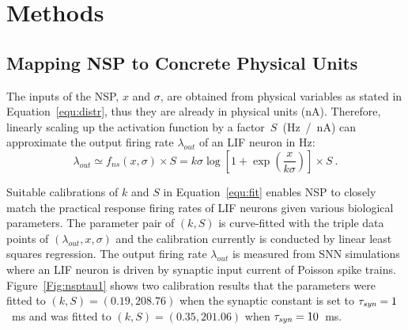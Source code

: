 \documentclass{article}
\begin{document}
	
	\section{Methods}	
	\label{sec:meth}
	
	\subsection{Mapping NSP to Concrete Physical Units}
	\label{sec:af_model}
	The inputs of the NSP, $x$ and $\sigma$, are obtained from physical variables as stated in Equation~\ref{equ:distr}, thus they are already in physical units (nA).
	Therefore, linearly scaling up the activation function by a factor~$S$~(Hz~/~nA) can approximate the output firing rate $\lambda_{out}$ of an LIF neuron in Hz:
	\begin{equation}
	\lambda_{out} \simeq f_{ns}(x, \sigma) \times S = k \sigma \log [1 + \exp(\frac{x}{k \sigma})] \times S~.
	\label{equ:fit}
	\end{equation}	
	
	
	Suitable calibrations of $k$ and $S$ in Equation~\ref{equ:fit} enables NSP to closely match the practical response firing rates of LIF neurons given various biological parameters.
	The parameter pair of $(k, S)$ is curve-fitted with the triple data points of $(\lambda_{out}, x, \sigma)$ and the calibration currently is conducted by linear least squares regression.
	The output firing rate $\lambda_{out}$ is measured from SNN simulations where an LIF neuron is driven by synaptic input current of Poisson spike trains.
	Figure~\ref{Fig:nsptau1} shows two calibration results that 
	the parameters were fitted to $(k, S)=(0.19,208.76)$ when the synaptic constant is set to $\tau_{\textit{\textrm{syn}}}=1$~ms and was fitted to $(k, S)=(0.35,201.06)$ when $\tau_{\textit{\textrm{syn}}}=10$~ms.
	
\end{document}
